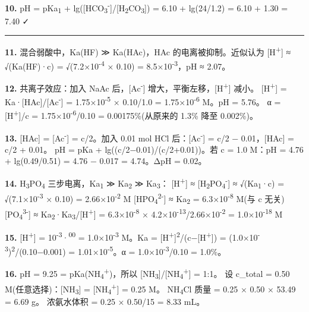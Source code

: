 \documentclass[a4paper,11pt]{ctexart}
\begin{document}
\textbf{10.} pH = pKa\textsubscript{1} + lg({[}HCO\textsubscript{3}\textsuperscript{-}{]}/{[}H\textsubscript{2}CO\textsubscript{3}{]}) = 6.10 + lg(24/1.2) = 6.10 + 1.30 = 7.40 ✓

\begin{center}\rule{0.5\linewidth}{0.5pt}\end{center}

\textbf{11.} 混合弱酸中，Ka(HF) ≫ Ka(HAc)，HAc 的电离被抑制。近似认为 {[}H\textsuperscript{+}{]} ≈ √(Ka(HF)·c) = √(7.2×10\textsuperscript{-4} × 0.10) = 8.5×10\textsuperscript{-3}，pH ≈ 2.07。

\textbf{12.} 共离子效应：加入 NaAc 后，{[}Ac\textsuperscript{-}{]} 增大，平衡左移，{[}H\textsuperscript{+}{]} 减小。
{[}H\textsuperscript{+}{]} = Ka·{[}HAc{]}/{[}Ac\textsuperscript{-}{]} = 1.75×10\textsuperscript{-5} × 0.10/1.0 = 1.75×10\textsuperscript{-6} M。pH = 5.76。
α = {[}H\textsuperscript{+}{]}/c = 1.75×10\textsuperscript{-6}/0.10 = 0.00175\%(从原来的 1.3\% 降至 0.002\%)。

\textbf{13.} {[}HAc{]} = {[}Ac\textsuperscript{-}{]} = c/2。加入 0.01 mol HCl 后：{[}Ac\textsuperscript{-}{]} = c/2 − 0.01，{[}HAc{]} = c/2 + 0.01。
pH = pKa + lg((c/2−0.01)/(c/2+0.01))。若 c = 1.0 M：pH = 4.76 + lg(0.49/0.51) = 4.76 − 0.017 = 4.74。ΔpH = 0.02。

\textbf{14.} H\textsubscript{3}PO\textsubscript{4} 三步电离，Ka\textsubscript{1} ≫ Ka\textsubscript{2} ≫ Ka\textsubscript{3}：
{[}H\textsuperscript{+}{]} ≈ {[}H\textsubscript{2}PO\textsubscript{4}\textsuperscript{-}{]} ≈ √(Ka\textsubscript{1}·c) = √(7.1×10\textsuperscript{-3} × 0.10) = 2.66×10\textsuperscript{-2} M
{[}HPO\textsubscript{4}\textsuperscript{2-}{]} ≈ Ka\textsubscript{2} = 6.3×10\textsuperscript{-8} M(与 c 无关)
{[}PO\textsubscript{4}\textsuperscript{3-}{]} ≈ Ka\textsubscript{2}·Ka\textsubscript{3}/{[}H\textsuperscript{+}{]} = 6.3×10\textsuperscript{-8} × 4.2×10\textsuperscript{-13}/2.66×10\textsuperscript{-2} = 1.0×10\textsuperscript{-18} M

\textbf{15.} {[}H\textsuperscript{+}{]} = 10\textsuperscript{-3}·\textsuperscript{00} = 1.0×10\textsuperscript{-3} M。Ka = {[}H\textsuperscript{+}{]}\textsuperscript{2}/(c−{[}H\textsuperscript{+}{]}) = (1.0×10\textsuperscript{-3})\textsuperscript{2}/(0.10−0.001) = 1.01×10\textsuperscript{-5}。α = 1.0×10\textsuperscript{-3}/0.10 = 1.0\%。

\textbf{16.} pH = 9.25 = pKa(NH\textsubscript{4}\textsuperscript{+})，所以 {[}NH\textsubscript{3}{]}/{[}NH\textsubscript{4}\textsuperscript{+}{]} = 1:1。
设 c\_total = 0.50 M(任意选择)：{[}NH\textsubscript{3}{]} = {[}NH\textsubscript{4}\textsuperscript{+}{]} = 0.25 M。
NH\textsubscript{4}Cl 质量 = 0.25 × 0.50 × 53.49 = 6.69 g。
浓氨水体积 = 0.25 × 0.50/15 = 8.33 mL。
\end{document}
